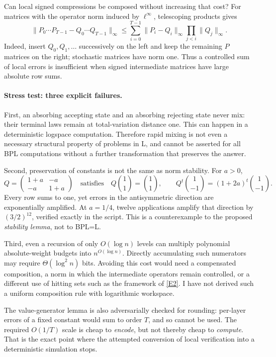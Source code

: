 \documentclass[11pt,a4paper]{article}
\newcommand{\eref}[2]{\hyperlink{extra:#1:#2}{[E#2]}}
\numberwithin{equation}{section}
\begin{document}
Can local signed compressions be composed without increasing that cost?
For matrices with the operator norm induced by $\ell^\infty$, telescoping
products gives
\begin{equation}\label{30004922:product-error}
 \|P_0\cdots P_{T-1}-Q_0\cdots Q_{T-1}\|_\infty
 \le\sum_{i=0}^{T-1}
       \|P_i-Q_i\|_\infty
       \prod_{j<i}\|Q_j\|_\infty.
\end{equation}
Indeed, insert $Q_0, Q_1,\ldots$ successively on the left and keep the
remaining $P$ matrices on the right; stochastic matrices have norm one.
Thus a controlled sum of local errors is insufficient when signed
intermediate matrices have large absolute row sums.

\paragraph{Stress test: three explicit failures.}
First, an absorbing accepting state and an absorbing rejecting state
never mix: their terminal laws remain at total-variation distance one.
This can happen in a deterministic logspace computation. Therefore
rapid mixing is not even a necessary structural property of problems in
L, and cannot be asserted for all BPL computations without a further
transformation that preserves the answer.

Second, preservation of constants is not the same as norm stability.
For $a>0$,
\[
 Q=\begin{pmatrix}1+a&-a\\-a&1+a\end{pmatrix}
 \quad\text{satisfies}\quad
 Q\binom11=\binom11,
 \qquad Q^t\binom1{-1}=(1+2a)^t\binom1{-1}.
\]
Every row sums to one, yet errors in the antisymmetric direction are
exponentially amplified. At $a=1/4$, twelve applications amplify that
direction by $(3/2)^{12}$, verified exactly in the script. This is a
counterexample to the proposed \emph{stability lemma}, not to BPL=L.

Third, even a recursion of only $O(\log n)$ levels can multiply
polynomial absolute-weight budgets into $n^{O(\log n)}$. Directly
accumulating such numerators may require $\Theta(\log^2 n)$ bits.
Avoiding this cost would need a compensated composition, a norm in which
the intermediate operators remain controlled, or a different use of
hitting sets such as the framework of \eref{30004922}{2}. I have not derived
such a uniform composition rule with logarithmic workspace.

The value-generator lemma is also adversarially checked for rounding:
per-layer errors of a fixed constant would sum to order $T$, and so
cannot be used. The required $O(1/T)$ scale is cheap to \emph{encode},
but not thereby cheap to \emph{compute}. That is the exact point where
the attempted conversion of local verification into a deterministic
simulation stops.
\end{document}
